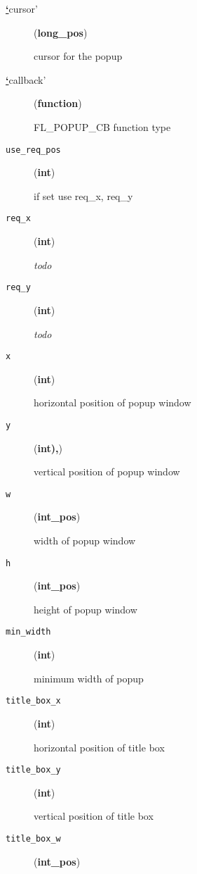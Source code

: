 \begin{description}
\item[{%
\hyperlink{id5}{\textbf{\color{red}`}}cursor'}] \leavevmode (\textbf{long\_pos})

cursor for the popup

\item[{%
\hyperlink{id7}{\textbf{\color{red}`}}callback'}] \leavevmode (\textbf{function})

FL\_POPUP\_CB function type

\item[{\texttt{use\_req\_pos}}] \leavevmode (\textbf{int})

if set use req\_x, req\_y

\item[{\texttt{req\_x}}] \leavevmode (\textbf{int})

\emph{todo}

\item[{\texttt{req\_y}}] \leavevmode (\textbf{int})

\emph{todo}

\item[{\texttt{x}}] \leavevmode (\textbf{int})

horizontal position of popup window

\item[{\texttt{y}}] \leavevmode (\textbf{int),})

vertical position of popup window

\item[{\texttt{w}}] \leavevmode (\textbf{int\_pos})

width of popup window

\item[{\texttt{h}}] \leavevmode (\textbf{int\_pos})

height of popup window

\item[{\texttt{min\_width}}] \leavevmode (\textbf{int})

minimum width of popup

\item[{\texttt{title\_box\_x}}] \leavevmode (\textbf{int})

horizontal position of title box

\item[{\texttt{title\_box\_y}}] \leavevmode (\textbf{int})

vertical position of title box

\item[{\texttt{title\_box\_w}}] \leavevmode (\textbf{int\_pos})


\end{description}
